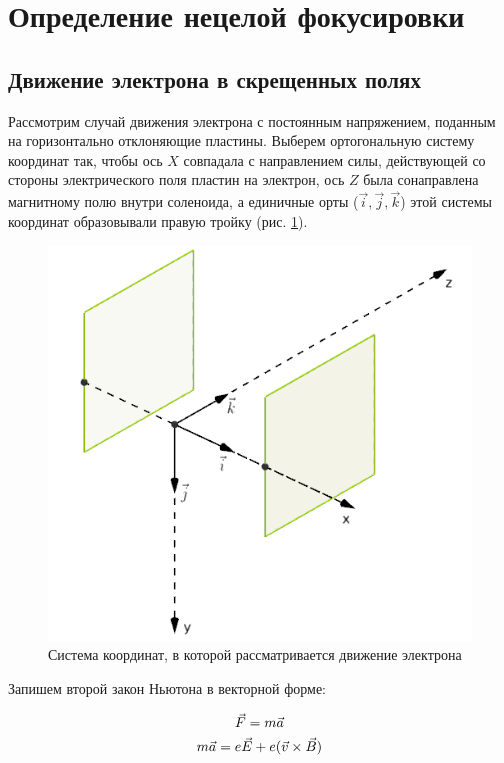 \newpage
\section{Определение нецелой фокусировки}

\subsection{Движение электрона в скрещенных полях}

Рассмотрим случай движения электрона с постоянным напряжением, поданным на горизонтально отклоняющие пластины. Выберем ортогональную систему координат так, чтобы ось $X$ совпадала с направлением силы, действующей со стороны электрического поля пластин на электрон, ось $Z$ была сонаправлена магнитному полю внутри соленоида, а единичные орты ($\vec{i},\vec{j},\vec{k}$) этой системы координат образовывали правую тройку (рис. \ref{fig:axes}).

\begin{figure}[ht!]
	\centering
	\includegraphics[scale=0.5]{img/axes.png}
	\caption{Система координат, в которой рассматривается движение электрона}
	\label{fig:axes}
\end{figure}

Запишем второй закон Ньютона в векторной форме:

\begin{gather}
	\vec{F}=m\vec{a}\\
	m\vec{a}=e\vec{E}+e(\vec{v}\times\vec{B})
\end{gather}

